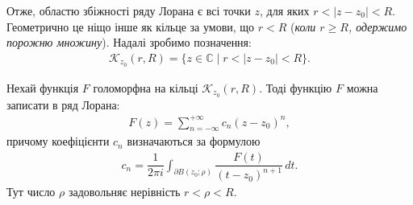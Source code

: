 \documentclass{math_library}
\begin{document}
Отже, областю збіжності ряду Лорана є всі точки $z$, для яких $r < |z-z_0| < R$. Геометрично це ніщо інше як кільце за умови, що $r < R$ (\textit{коли $r \geq R$, одержимо порожню множину}). Надалі зробимо позначення:
\begin{align*}
\mathcal{K}_{z_0}(r,R) = \{ z \in \mathbb{C} \mid r < |z-z_0| < R \}.
\end{align*}

\begin{theorem}
Нехай функція $F$ голоморфна на кільці $\mathcal{K}_{z_0}(r,R)$. Тоді функцію $F$ можна записати в ряд Лорана:
\begin{align*}
F(z) = \sum_{n=-\infty}^{+\infty} c_n(z-z_0)^n,
\end{align*}
причому коефіцієнти $c_n$ визначаються за формулою
\begin{align*}
c_n = \dfrac{1}{2\pi i} \int_{\partial B(z_0;\rho)} \dfrac{F(t)}{(t-z_0)^{n+1}}\,dt.
\end{align*}
Тут число $\rho$ задовольняє нерівність $r < \rho < R$.
\end{theorem}
\end{document}
